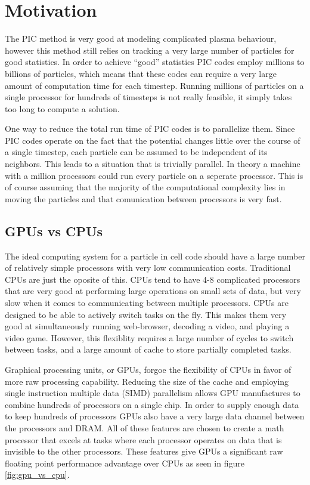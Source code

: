 	\section{Motivation}

	The PIC method is very good at modeling complicated plasma behaviour, however this method still relies on tracking a very large number of particles for good statistics. In order to achieve ``good'' statistics PIC codes employ millions to billions of particles, which means that these codes can require a very large amount of computation time for each timestep. Running millions of particles on a single processor for hundreds of timesteps is not really feasible, it simply takes too long to compute a solution. 
	
	One way to reduce the total run time of PIC codes is to parallelize them. Since PIC codes operate on the fact that the potential changes little over the course of a single timestep, each particle can be assumed to be independent of its neighbors. This leads to a situation that is trivially parallel. In theory a machine with a million processors could run every particle on a seperate processor. This is of course assuming that the majority of the computational complexity lies in moving the particles and that comunication between processors is very fast.  


		\subsection{GPUs vs CPUs}
	The ideal computing system for a particle in cell code should have a large number of relatively simple processors with very low communication costs. Traditional CPUs are just the oposite of this. CPUs tend to have 4-8 complicated processors that are very good at performing large operations on small sets of data, but very slow when it comes to communicating between multiple processors. CPUs are designed to be able to actively switch tasks on the fly. This makes them very good at simultaneously running web-browser, decoding a video, and playing a video game. However, this flexiblity requires a large number of cycles to switch between tasks, and a large amount of cache to store partially completed tasks.

Graphical processing units, or GPUs, forgoe the flexibility of CPUs in favor of more raw processing capability. Reducing the size of the cache and employing single instruction multiple data (SIMD) parallelism allows GPU manufactures to combine hundreds of processors on a single chip. In order to supply enough data to keep hundreds of processors GPUs also have a very large data channel between the processors and DRAM. All of these features are chosen to create a math processor that excels at tasks where each processor operates on data that is invisible to the other processors. These features give GPUs a significant raw floating point performance advantage over CPUs as seen in figure \ref{fig:gpu_vs_cpu}. 


